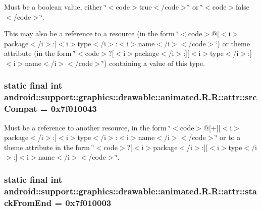 Must be a boolean value, either \char`\"{}$<$code$>$true$<$/code$>$\char`\"{} or \char`\"{}$<$code$>$false$<$/code$>$\char`\"{}. 

This may also be a reference to a resource (in the form \char`\"{}$<$code$>$@\mbox{[}$<$i$>$package$<$/i$>$:\mbox{]}$<$i$>$type$<$/i$>$:$<$i$>$name$<$/i$>$$<$/code$>$\char`\"{}) or theme attribute (in the form \char`\"{}$<$code$>$?\mbox{[}$<$i$>$package$<$/i$>$:\mbox{]}\mbox{[}$<$i$>$type$<$/i$>$:\mbox{]}$<$i$>$name$<$/i$>$$<$/code$>$\char`\"{}) containing a value of this type. \hypertarget{classandroid_1_1support_1_1graphics_1_1drawable_1_1animated_1_1_r_1_1attr_f20cf05e6ae922174b8c1604926e07e8}{
\subsubsection[{srcCompat}]{\setlength{\rightskip}{0pt plus 5cm}static final int android::support::graphics::drawable::animated.R.R::attr::srcCompat = 0x7f010043}}
\label{classandroid_1_1support_1_1graphics_1_1drawable_1_1animated_1_1_r_1_1attr_f20cf05e6ae922174b8c1604926e07e8}


Must be a reference to another resource, in the form \char`\"{}$<$code$>$@\mbox{[}+\mbox{]}\mbox{[}$<$i$>$package$<$/i$>$:\mbox{]}$<$i$>$type$<$/i$>$:$<$i$>$name$<$/i$>$$<$/code$>$\char`\"{} or to a theme attribute in the form \char`\"{}$<$code$>$?\mbox{[}$<$i$>$package$<$/i$>$:\mbox{]}\mbox{[}$<$i$>$type$<$/i$>$:\mbox{]}$<$i$>$name$<$/i$>$$<$/code$>$\char`\"{}. \hypertarget{classandroid_1_1support_1_1graphics_1_1drawable_1_1animated_1_1_r_1_1attr_808b1985f8087b5ce869c4692c8442b7}{
\subsubsection[{stackFromEnd}]{\setlength{\rightskip}{0pt plus 5cm}static final int android::support::graphics::drawable::animated.R.R::attr::stackFromEnd = 0x7f010003}}
\label{classandroid_1_1support_1_1graphics_1_1drawable_1_1animated_1_1_r_1_1attr_808b1985f8087b5ce869c4692c8442b7}



